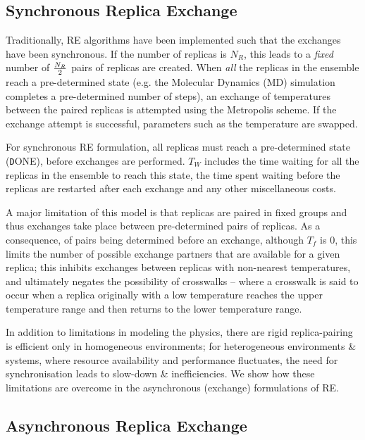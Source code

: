 \documentclass{rspublic}
\begin{document}
\subsection{Synchronous Replica Exchange}

Traditionally, RE algorithms have been implemented such that the
exchanges have been synchronous.  If the number of replicas is
${N_R}$, this leads to a {\it fixed} number of ${N_R \over 2}$ pairs
of replicas are created.  When \emph{all} the replicas in the ensemble
reach a pre-determined state (e.g. the Molecular Dynamics (MD)
simulation completes a pre-determined number of steps), an exchange of
temperatures between the paired replicas is attempted using the
Metropolis scheme.  If the exchange attempt is successful, parameters
such as the temperature are swapped.


For synchronous RE formulation, all replicas must reach a
pre-determined state ({\texttt DONE}), before exchanges are performed.
$T_W$ includes the time waiting for all the replicas in the ensemble
to reach this state, the time spent waiting before the replicas are
restarted after each exchange and any other miscellaneous costs.

A major limitation of this model is that replicas are paired in fixed
groups and thus exchanges take place between pre-determined pairs of
replicas.  As a consequence, of pairs being determined before an
exchange, although $T_f$ is $0$, this limits the number of possible
exchange partners that are available for a given replica; this
inhibits exchanges between replicas with non-nearest temperatures, and
ultimately negates the possibility of crosswalks -- where a crosswalk
is said to occur when a replica originally with a low temperature
reaches the upper temperature range and then returns to the lower
temperature range.

In addition to limitations in modeling the physics, there are rigid
replica-pairing is efficient only in homogeneous environments; for
heterogeneous environments \& systems, where resource availability and
performance fluctuates, the need for synchronisation leads to
slow-down \& inefficiencies. We show how these limitations are
overcome in the asynchronous (exchange) formulations of RE.

\subsection{Asynchronous Replica Exchange}
\end{document}
